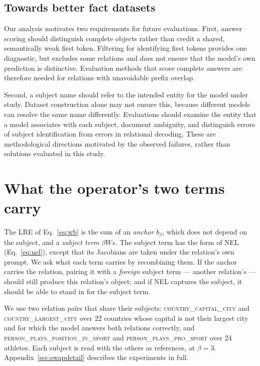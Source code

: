 \subsection{Towards better fact datasets}
Our analysis motivates two requirements for future evaluations. First,
answer scoring should distinguish complete objects rather than credit a shared,
semantically weak first token. Filtering for identifying first tokens provides
one diagnostic, but excludes some relations and does not ensure that the model's
own prediction is distinctive. Evaluation methods that score complete answers
are therefore needed for relations with unavoidable prefix overlap.

Second, a subject name should refer to the intended entity for the model under
study. Dataset construction alone may not ensure this, because different models
can resolve the same name differently. Evaluations should examine the entity
that a model associates with each subject, document ambiguity, and distinguish
errors of subject identification from errors in relational decoding. These are
methodological directions motivated by the observed failures, rather than
solutions evaluated in this study.





\section{What the operator's two terms carry}
\label{sec:swap}

The LRE of Eq.~\ref{eq:wb} is the sum of an \emph{anchor} $b_\beta$,
which does not depend on the subject, and a \emph{subject term}
$\beta W s$. The subject term has the form of NEL
(Eq.~\ref{eq:nel}), except that its Jacobians are taken under the
relation's own prompt. We ask what each term carries by recombining
them. If the anchor carries the relation, pairing it with a
\emph{foreign} subject term --- another relation's --- should still
produce this relation's object; and if NEL captures the subject, it
should be able to stand in for the subject term.

We use two relation pairs that share their subjects:
\textsc{country\_capital\_city} and \textsc{country\_largest\_city} over
22 countries whose capital is not their largest city and for which the
model answers both relations correctly, and
\textsc{person\_plays\_position\_in\_sport} and
\textsc{person\_plays\_pro\_sport} over 24 athletes. Each subject is read
with the others as references, at $\beta = 3$.
Appendix~\ref{sec:swapdetail} describes the experiments in full.

